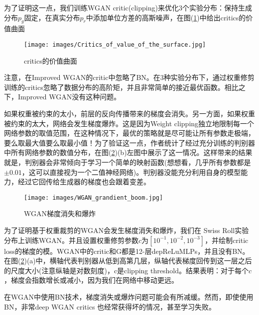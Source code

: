             \par
            为了证明这一点，我们训练WGAN critic(clipping)来优化3个实验分布：保持生成分布$p_g$固定，在真实分布$p_r$中添加单位方差的高斯噪声，在图(\ref{fig:critics的价值曲面})中给出critics的价值曲面
                \begin{figure}[H]
                \centering
                \texttt{[image: images/Critics\_of\_value\_of\_the\_surface.jpg]}
                \caption{critics的价值曲面}
                \label{fig:critics的价值曲面}
                \end{figure}
            注意，在Improved WGAN的critic中忽略了BN。在3种实验分布下，通过权重修剪训练的critics忽略了数据分布的高阶矩，并且非常简单的接近最优函数。相比之下，Improved WGAN没有这种问题。
            \par
            如果权重被约束的太小，前层的反向传播带来的梯度会消失。另一方面，如果权重被约束的太大，网络会发生梯度爆炸。这是因为Weight clipping独立地限制每一个网络参数的取值范围，在这种情况下，最优的策略就是尽可能让所有参数走极端，要么取最大值要么取最小值！为了验证这一点，作者统计了经过充分训练的判别器中所有网络参数的数值分布，在图(\ref{fig:WGAN梯度消失和爆炸})(b)左图中展示了这一情况。这样带来的结果就是，判别器会非常倾向于学习一个简单的映射函数(想想看，几乎所有参数都是$\pm0.01$，这可以直接视为一个二值神经网络)。判别器没能充分利用自身的模型能力，经过它回传给生成器的梯度也会跟着变差。
                \begin{figure}[H]
                \centering
                \texttt{[image: images/WGAN\_grandient\_boom.jpg]}
                \caption{WGAN梯度消失和爆炸}
                \label{fig:WGAN梯度消失和爆炸}
                \end{figure}
            \par
            为了证明基于权重裁剪的WGAN会发生梯度消失和爆炸，我们在 Swiss Roll实验分布上训练WGAN。并且设置权重修剪参数$c$为$[10^{-1},10^{-2},10^{-3}]$，并绘制critic loss的梯度的模。WGAN中的critic和G都是12-层depReLuMLPs，并且没有BN。在图(\ref{fig:WGAN梯度消失和爆炸})(a)中，横轴代表判别器从低到高第几层，纵轴代表梯度回传到这一层之后的尺度大小(注意纵轴是对数刻度)，c是clipping threshold。结果表明：对于每个$c$，梯度会指数增长或减小，因为我们在网络中移动更远。
            \par
            在WGAN中使用BN技术，梯度消失或爆炸问题可能会有所减缓。然而，即使使用BN，非常deep WGAN critics 也经常获得坏的情况，甚至学习失败。
